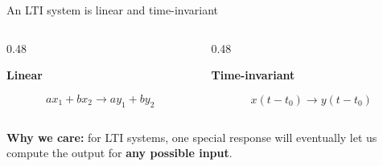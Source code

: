 \documentclass[aspectratio=169,11pt]{beamer}
\newcommand{\CardTitleSize}{\large}
\newcommand{\CardTitle}[1]{%
  \vspace{0.15cm}
  {\CardTitleSize\bfseries #1}\par
}
\begin{document}
\begin{frame}{An LTI system is linear and time-invariant}

\begin{columns}[T,totalwidth=\textwidth]

\begin{column}{0.48\textwidth}
\begin{GreenCard}[halign=center,top=12pt,bottom=12pt]
\CardTitle{Linear}

\vspace{0.08cm}

{\Large
\[
a x_1+b x_2
\longrightarrow
a y_1+b y_2
\]
}


\end{GreenCard}
\end{column}

\begin{column}{0.48\textwidth}
\begin{OrangeCard}[halign=center,top=12pt,bottom=12pt]
\CardTitle{Time-invariant}

\vspace{0.08cm}

{\Large
\[
x(t-t_0)
\longrightarrow
y(t-t_0)
\]
}


\end{OrangeCard}
\end{column}

\end{columns}

\vspace{0.16cm}

\begin{BlueBox}[
  calloutshadedblue,
  halign=center,
  fontupper=\large
]{}
\textbf{Why we care:} for LTI systems, one special response will eventually let us compute the output for \textbf{any possible input}.
\end{BlueBox}

\end{frame}
\end{document}

